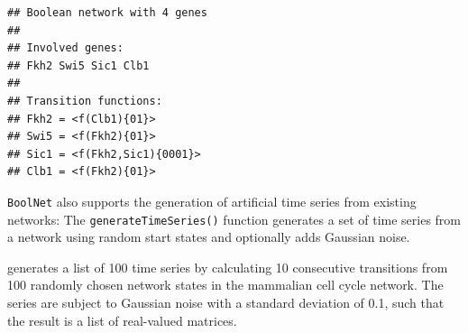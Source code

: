 \documentclass[a4paper]{article}
\begin{document}
\begin{knitrout}
\color{fgcolor}\begin{kframe}
\begin{alltt}
\end{alltt}
\begin{verbatim}
## Boolean network with 4 genes
## 
## Involved genes:
## Fkh2 Swi5 Sic1 Clb1
## 
## Transition functions:
## Fkh2 = <f(Clb1){01}>
## Swi5 = <f(Fkh2){01}>
## Sic1 = <f(Fkh2,Sic1){0001}>
## Clb1 = <f(Fkh2){01}>
\end{verbatim}
\end{kframe}
\end{knitrout}

\begin{sloppypar}
\texttt{BoolNet} also supports the generation of artificial time series from existing networks: The \texttt{generateTimeSeries()} function generates a set of time series from a network using random start states and optionally adds Gaussian noise.
\end{sloppypar}

\begin{knitrout}
\color{fgcolor}\begin{kframe}
\begin{alltt}
 \hlkwb{<-} 
                             \hlstd{=}\hlstd{,}
                             \hlstd{=}\hlstd{,}
                             \hlstd{=}\hlstd{)}
\end{alltt}
\end{kframe}
\end{knitrout}
generates a list of 100 time series by calculating 10 consecutive transitions from 100 randomly chosen network states in the mammalian cell cycle network. The series are subject to Gaussian noise with a standard deviation of 0.1, such that the result is a list of real-valued matrices.
\end{document}
